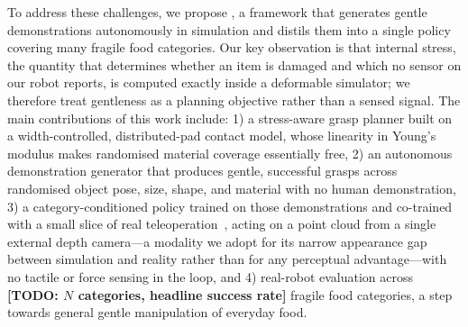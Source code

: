 To address these challenges, we propose \method, a framework that generates gentle
demonstrations autonomously in simulation and distils them into a single policy covering many
fragile food categories. Our key observation is that internal stress, the quantity that
determines whether an item is damaged and which no sensor on our robot reports, is computed
exactly inside a deformable simulator; we therefore treat gentleness as a planning objective
rather than a sensed signal. The main contributions of this work include: 1) a stress-aware
grasp planner built on a width-controlled, distributed-pad contact model, whose linearity in
Young's modulus makes randomised material coverage essentially free, 2) an autonomous
demonstration generator that produces gentle, successful grasps across randomised object pose,
size, shape, and material with no human demonstration, 3) a category-conditioned policy trained
on those demonstrations and co-trained with a small slice of real
teleoperation~\cite{simrealcotrain}, acting on a point cloud from a single external depth
camera---a modality we adopt for its narrow appearance gap between simulation and reality
rather than for any perceptual advantage---with no tactile or force sensing in the loop, and
4) real-robot evaluation across
\textbf{[TODO: $N$ categories, headline success rate]} fragile food categories, a step towards
general gentle manipulation of everyday food.
